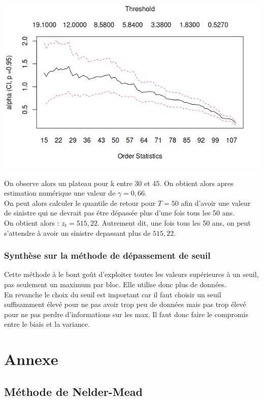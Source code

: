 \documentclass{article}
\theoremstyle{plain}
\theoremstyle{definition}
\theoremstyle{plain}
\begin{document}
\begin{center}
	\includegraphics[scale=0.70]{./images/danishsad.png} 
\end{center}

On observe alors un plateau pour k entre 30 et 45. On obtient alors apres estimation numérique une valeur de $\gamma = 0,66$.
\\
On peut alors calculer le quantile de retour pour $T=50$ afin d'avoir une valeur de sinistre qui ne devrait pas être dépassée plus d'une fois tous les 50 ans.
\\
On obtient alors : $z_t = 515,22$. Autrement dit, une fois tous les 50 ans, on peut s'attendre à avoir un sinistre depassant plus de $515,22$.

\subsubsection{Synthèse sur la méthode de dépassement de seuil}
Cette méthode à le bont goût d'exploiter toutes les valeurs supérieures à un seuil, pas seulement un maximum par bloc. Elle utilise donc plus de données.
\\
En revanche le choix du seuil est important car il faut choisir un seuil suffisamment élevé pour ne pas avoir trop peu de données mais pas trop élevé pour ne pas perdre d'informations sur les max. Il faut donc faire le compromis entre le biais et la variance.

\newpage
\section{Annexe}

\subsection{Méthode de Nelder-Mead}
\end{document}
